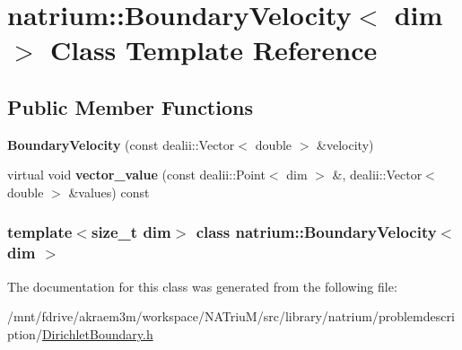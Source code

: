 \hypertarget{classnatrium_1_1BoundaryVelocity}{
\section{natrium::BoundaryVelocity$<$ dim $>$ Class Template Reference}
\label{classnatrium_1_1BoundaryVelocity}
}
\subsection*{Public Member Functions}
\begin{DoxyCompactItemize}
\item 
\hypertarget{classnatrium_1_1BoundaryVelocity_af1152b7fba47fb5756cd286e849e3587}{
{\bfseries BoundaryVelocity} (const dealii::Vector$<$ double $>$ \&velocity)}
\label{classnatrium_1_1BoundaryVelocity_af1152b7fba47fb5756cd286e849e3587}

\item 
\hypertarget{classnatrium_1_1BoundaryVelocity_ab47b247a35c5f6a7fcee9765a47e2f97}{
virtual void {\bfseries vector\_\-value} (const dealii::Point$<$ dim $>$ \&, dealii::Vector$<$ double $>$ \&values) const }
\label{classnatrium_1_1BoundaryVelocity_ab47b247a35c5f6a7fcee9765a47e2f97}

\end{DoxyCompactItemize}
\subsubsection*{template$<$size\_\-t dim$>$ class natrium::BoundaryVelocity$<$ dim $>$}



The documentation for this class was generated from the following file:\begin{DoxyCompactItemize}
\item 
/mnt/fdrive/akraem3m/workspace/NATriuM/src/library/natrium/problemdescription/\hyperlink{DirichletBoundary_8h}{DirichletBoundary.h}\end{DoxyCompactItemize}
